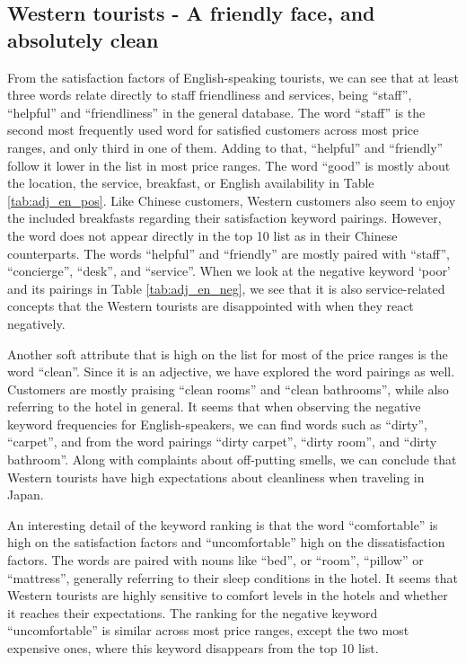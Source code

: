 \documentclass[smallextended,natbib]{svjour3}       %
\begin{document}
  \subsection{Western tourists - A friendly face, and absolutely clean}\label{disc:en}

    From the satisfaction factors of English-speaking tourists, we can see that at least three words relate directly to staff friendliness and services, being ``staff'', ``helpful'' and ``friendliness'' in the general database. The word ``staff'' is the second most frequently used word for satisfied customers across most price ranges, and only third in one of them. Adding to that, ``helpful'' and ``friendly'' follow it lower in the list in most price ranges. The word ``good'' is mostly about the location, the service, breakfast, or English availability in Table \ref{tab:adj_en_pos}. Like Chinese customers, Western customers also seem to enjoy the included breakfasts regarding their satisfaction keyword pairings. However, the word does not appear directly in the top 10 list as in their Chinese counterparts. The words ``helpful'' and ``friendly'' are mostly paired with ``staff'', ``concierge'', ``desk'', and ``service''. When we look at the negative keyword ‘poor’ and its pairings in Table \ref{tab:adj_en_neg}, we see that it is also service-related concepts that the Western tourists are disappointed with when they react negatively.

    Another soft attribute that is high on the list for most of the price ranges is the word ``clean''. Since it is an adjective, we have explored the word pairings as well. Customers are mostly praising ``clean rooms'' and ``clean bathrooms'', while also referring to the hotel in general. It seems that when observing the negative keyword frequencies for English-speakers, we can find words such as ``dirty'', ``carpet'', and from the word pairings ``dirty carpet'', ``dirty room'', and ``dirty bathroom''. Along with complaints about off-putting smells, we can conclude that Western tourists have high expectations about cleanliness when traveling in Japan.

    An interesting detail of the keyword ranking is that the word ``comfortable'' is high on the satisfaction factors and ``uncomfortable'' high on the dissatisfaction factors. The words are paired with nouns like ``bed'', or ``room'', ``pillow'' or ``mattress'', generally referring to their sleep conditions in the hotel.
    It seems that Western tourists are highly sensitive to comfort levels in the hotels and whether it reaches their expectations. The ranking for the negative keyword ``uncomfortable'' is similar across most price ranges, except the two most expensive ones, where this keyword disappears from the top 10 list.
\end{document}
